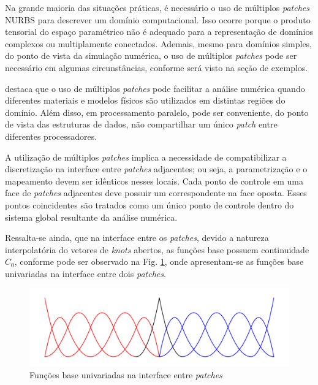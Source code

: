 \documentclass[tese_patricia]{subfiles}
\begin{document}
Na grande maioria das situações práticas, é necessário o uso de múltiplos \textit{patches} NURBS para descrever um domínio computacional. Isso ocorre porque o produto tensorial do espaço paramétrico não é adequado para a representação de domínios complexos ou multiplamente conectados. Ademais, mesmo para domínios simples, do ponto de vista da simulação numérica, o uso de múltiplos \textit{patches} pode ser necessário em algumas circunstâncias, conforme será visto na seção de exemplos.

 destaca que o uso de múltiplos \textit{patches} pode facilitar a análise numérica quando diferentes materiais e modelos físicos são utilizados em distintas regiões do domínio. Além disso, em processamento paralelo, pode ser conveniente, do ponto de vista das estruturas de dados, não compartilhar um único \textit{patch} entre diferentes processadores.

A utilização de múltiplos \textit{patches} implica a necessidade de compatibilizar a discretização na interface entre \textit{patches} adjacentes; ou seja, a parametrização e o mapeamento devem ser idênticos nesses locais. Cada ponto de controle em uma face de \textit{patches} adjacentes deve possuir um correspondente na face oposta. Esses pontos coincidentes são tratados como um único ponto de controle dentro do sistema global resultante da análise numérica.

Ressalta-se ainda, que na interface entre os \textit{patches}, devido a natureza interpolatória do vetores de \textit{knots} abertos, as funções base possuem continuidade $C_0$, conforme pode ser observado na Fig. \ref{fig:multiplos_patches}, onde apresentam-se as funções base univariadas na interface entre dois \textit{patches}.

\begin{figure}[htb!]
	\centering 
	\includegraphics[scale=0.5,trim=0cm 0cm 0cm 0cm, clip=true]{Imagens/Cap3/patches.pdf}	
	\caption{Funções base univariadas na interface entre \textit{patches}}
	\label{fig:multiplos_patches}
\end{figure}
\end{document}
